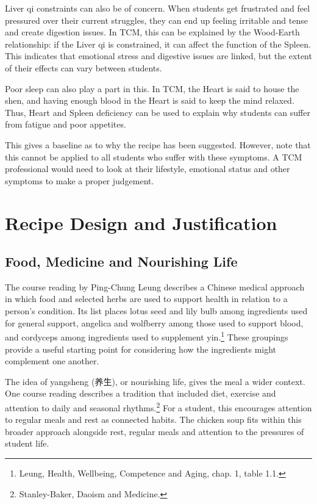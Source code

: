 \documentclass[12pt,a4paper]{article}
\begin{document}
Liver qi constraints can also be of concern. When students get frustrated and feel pressured over their current struggles, they can end up feeling irritable and tense and create digestion issues. In TCM, this can be explained by the Wood-Earth relationship: if the Liver qi is constrained, it can affect the function of the Spleen. This indicates that emotional stress and digestive issues are linked, but the extent of their effects can vary between students.

Poor sleep can also play a part in this. In TCM, the Heart is said to house the shen, and having enough blood in the Heart is said to keep the mind relaxed. Thus, Heart and Spleen deficiency can be used to explain why students can suffer from fatigue and poor appetites.

This gives a baseline as to why the recipe has been suggested. However, note that this cannot be applied to all students who suffer with these symptoms. A TCM professional would need to look at their lifestyle, emotional status and other symptoms to make a proper judgement.

\newpage
\section{Recipe Design and Justification}
\subsection{Food, Medicine and Nourishing Life}
The course reading by Ping-Chung Leung describes a Chinese medical approach in which food and selected herbs are used to support health in relation to a person's condition. Its list places lotus seed and lily bulb among ingredients used for general support, angelica and wolfberry among those used to support blood, and cordyceps among ingredients used to supplement yin.\footnote{Leung, Health, Wellbeing, Competence and Aging, chap. 1, table 1.1.} These groupings provide a useful starting point for considering how the ingredients might complement one another.

The idea of yangsheng (养生), or nourishing life, gives the meal a wider context. One course reading describes a tradition that included diet, exercise and attention to daily and seasonal rhythms.\footnote{Stanley-Baker, Daoism and Medicine.} For a student, this encourages attention to regular meals and rest as connected habits. The chicken soup fits within this broader approach alongside rest, regular meals and attention to the pressures of student life.
\end{document}
